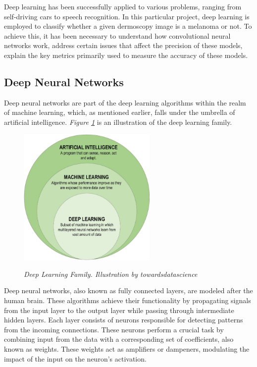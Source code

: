 Deep learning has been successfully applied to various problems, ranging from self-driving cars to speech recognition. In this particular project, deep learning is employed to classify whether a given dermoscopy image is a melanoma or not. To achieve this, it has been necessary to understand how convolutional neural networks work, address certain issues that affect the precision of these models, explain the key metrics primarily used to measure the accuracy of these models.


\subsection{Deep Neural Networks}

Deep neural networks are part of the deep learning algorithms within the realm of machine learning, which, as mentioned earlier, falls under the umbrella of artificial intelligence. \textit{Figure \ref{fig:deep-learning-family}} is an illustration of the deep learning family. \\

\begin{figure}[H]
\centering
\includegraphics[width=0.6\textwidth]{imatges/preliminaries/deep-learning-familiy.png}
\caption[Deep Learning Family]{\textit{Deep Learning Family. Illustration by towardsdatascience}}
{\label{fig:deep-learning-family}}
\end{figure}

Deep neural networks, also known as fully connected layers, are modeled after the human brain. These algorithms achieve their functionality by propagating signals from the input layer to the output layer while passing through intermediate hidden layers. Each layer consists of neurons responsible for detecting patterns from the incoming connections. These neurons perform a crucial task by combining input from the data with a corresponding set of coefficients, also known as weights. These weights act as amplifiers or dampeners, modulating the impact of the input on the neuron's activation. \\

